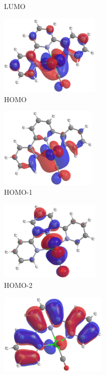 \begin{figure}[!ht]
\begin{subfigure}[b]{0.31\textwidth}
  \caption{LUMO}
 \end{subfigure}
 \begin{subfigure}[b]{0.31\textwidth}
  \includegraphics[clip=true, width=\textwidth, height=39mm, keepaspectratio]{images/mos/2h.eps}
  \caption{HOMO}
 \end{subfigure}
 \begin{subfigure}[b]{0.31\textwidth}
  \includegraphics[clip=true, width=\textwidth, height=39mm, keepaspectratio]{images/mos/2h-1.eps}
  \caption{HOMO-1}
 \end{subfigure}
 \begin{subfigure}[b]{0.31\textwidth}
  \includegraphics[clip=true, width=\textwidth, height=39mm, keepaspectratio]{images/mos/2h-2.eps}
  \caption{HOMO-2}
 \end{subfigure}
 \begin{subfigure}[b]{0.31\textwidth}
  \includegraphics[clip=true, width=\textwidth, height=39mm, keepaspectratio]{images/mos/2h-3.eps}

\end{subfigure}
\end{figure}
